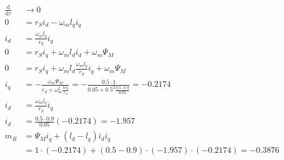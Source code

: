 \documentclass[11pt,a4paper]{scrartcl}
\newcommand{\mybr}[1]{\left(#1\right)}
\newcommand{\0}{_{\mybr{0}}}
\newcommand{\1}{_{\mybr{1}}}
\newcommand{\2}{_{\mybr{2}}}
\renewcommand{\d}{\mathrm{d}}
\begin{document}
\subsection{}
\begin{align}
\frac{\d}{\d\tau} &\rightarrow 0\\
0&=r_S i_d -\omega_m l_q i_q\\
i_d&=\frac{\omega_m l_q}{r_S} i_q\\
0&=r_S i_q+\omega_m l_d i_d + \omega_m\Psi_M \\
0&=r_S i_q+\omega_m l_d \frac{\omega_m l_q}{r_S} i_q + \omega_m\Psi_M \\
i_q&=-\frac{\omega_m \Psi_M}{r_S+\omega_m^2\frac{l_d l_q}{r_S}}=-\frac{\num{0.5}\cdot 1}{\num{0.05}+\num{0.5}^2\frac{\num{0.5}\cdot\num{0.9}}{\num{0.05}}}=\num{-0.2174}\\
i_d&=\frac{\omega_m l_q}{r_S} i_q\\
i_d&=\frac{\num{0.5}\cdot\num{0.9}}{\num{0.05}}\mybr{\num{-0.2174}}=\num{-1.957}\\
m_R&=\Psi_M i_q+\mybr{l_d-l_q}i_d i_q\\
&=1\cdot\mybr{\num{-0.2174}}+\mybr{\num{0.5}-\num{0.9}}\cdot\mybr{\num{-1.957}}\cdot\mybr{{\num{-0.2174}}}=\num{-0.3876}
\end{align}

\end{document}
